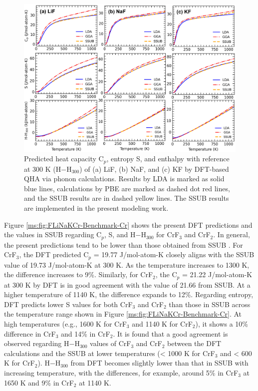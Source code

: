 \begin{figure}[h]
    \centering
    \includegraphics[width=1\linewidth]{moltensalts/Moltensalts-FLiNaKCr-Benchmark.jpg}
    \caption{Predicted heat capacity C$_p$, entropy S, and enthalpy with reference at 300 K (H$-$H$_{300}$) of (a) LiF, (b) NaF, and (c) KF by DFT-based QHA via phonon calculations. Results by LDA is marked as solid blue lines, calculations by PBE are marked as dashed dot red lines, and the SSUB results \cite{sgteurl} are in dashed yellow lines. The SSUB results are implemented in the present modeling work.}
    \label{ms:fig:FLiNaKCr-Benchmark}
\end{figure}

Figure \ref{ms:fig:FLiNaKCr-Benchmark-Cr} shows the present DFT predictions and the values in SSUB \cite{sgteurl} regarding C$_p$, S, and H$-$H$_{300}$ for CrF$_3$ and CrF$_2$. In general, the present predictions tend to be lower than those obtained from SSUB \cite{sgteurl}. For CrF$_3$, the DFT predicted C$_p$ = 19.77 J/mol-atom-K closely aligns with the SSUB value of 19.73 J/mol-atom-K at 300 K. As the temperature increases to 1300 K, the difference increases to 9\%. Similarly, for CrF$_2$, the C$_p$ = 21.22 J/mol-atom-K at 300 K by DFT is in good agreement with the value of 21.66 from SSUB. At a higher temperature of 1140 K, the difference expands to 12\%. Regarding entropy, DFT predicts lower S values for both CrF$_3$ and CrF$_2$ than those in SSUB across the temperature range shown in Figure \ref{ms:fig:FLiNaKCr-Benchmark-Cr}. At high temperatures (e.g., 1600 K for CrF$_3$ and 1140 K for CrF$_2$), it shows a 10\% difference in CrF$_3$ and 14\% in CrF$_2$. It is found that a good agreement is observed regarding H$-$H$_{300}$ values of CrF$_3$ and CrF$_2$ between the DFT calculations and the SSUB at lower temperatures (< 1000 K for CrF$_3$ and < 600 K for CrF$_2$). H$-$H$_{300}$ from DFT becomes slightly lower than that in SSUB \cite{sgteurl} with increasing temperature, with the differences, for example, around 5\% in CrF$_3$ at 1650 K and 9\% in CrF$_2$ at 1140 K.

